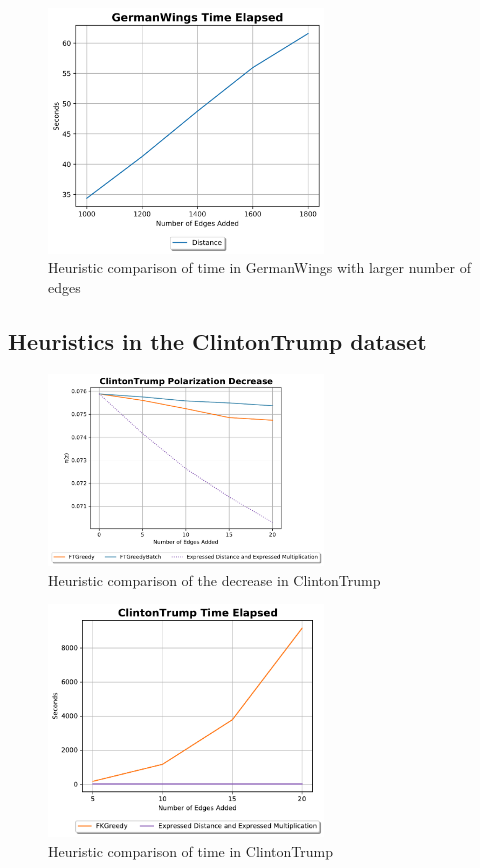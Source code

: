 \begin{table}[H]
\begin{figure}[H]
	\centering
	\includegraphics[width=0.65\textwidth]{Figures/GermanWings Time Elapsed 2}
	\caption{Heuristic comparison of time in GermanWings with larger number of edges}
	\label{fig:germanwings_time}
\end{figure}
\clearpage


\subsection{Heuristics in the ClintonTrump dataset}
\begin{figure}[H]
	\centering
	\includegraphics[width=0.65\textwidth]{Figures/ClintonTrump Polarization Decrease}
	\caption{Heuristic comparison of the decrease in ClintonTrump}
	\label{fig:ClintonTrump_pol}
\end{figure}


\begin{figure}[H]
	\centering
	\includegraphics[width=0.65\textwidth]{Figures/ClintonTrump Time Elapsed}
	\caption{Heuristic comparison of time in ClintonTrump}
	\label{fig:ClintonTrump_time}
\end{figure}
\clearpage


\end{table}
